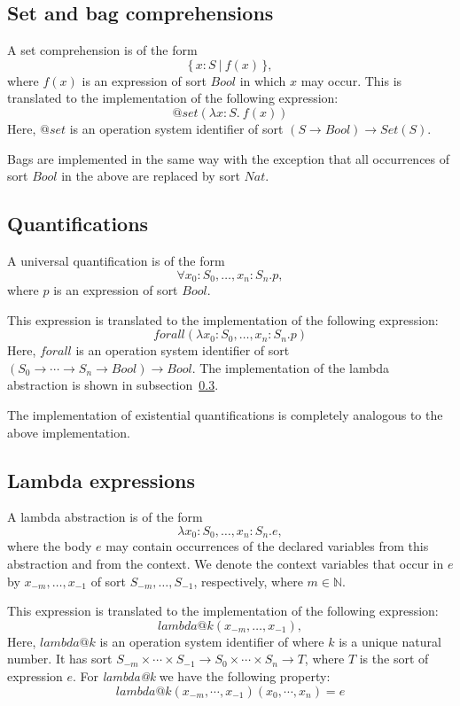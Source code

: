 \documentclass[a4paper,fleqn]{article}
\newcommand{\frm}[1]{\mbox{\ensuremath{#1}}}
\newcommand{\f}[1]{\ensuremath{\mathit{#1}}}
\newcommand{\fa}[2]{\ensuremath{\f{#1}(#2)}}
\newcommand{\set}[1]{\ensuremath{\{\,#1\,\}}}
\newcommand{\scompr}[2]{\ensuremath{\set{#1\ |\ #2}}}
\newcommand{\nat}{\ensuremath{\mathbb{N}}}
\newcommand{\srtbool}{\f{Bool}}
\newcommand{\srtnat}{\f{Nat}}
\begin{document}
\subsection{Set and bag comprehensions}

A set comprehension is of the form
\[\scompr{x{:}S}{\fa{f}{x}},\]
where \frm{\fa{f}{x}} is an expression of sort \frm{\srtbool} in which \frm{x}
may occur. This is translated to the implementation of the following
expression:
\[\fa{@set}{\lambda x{:}S.\ \fa{f}{x}}\]
Here, \frm{\f{@set}} is an operation system identifier of sort \frm{(S \to
\srtbool) \to \fa{Set}{S}}.

Bags are implemented in the same way with the exception that all occurrences of
sort \frm{\srtbool} in the above are replaced by sort \frm{\srtnat}.

\subsection{Quantifications}

A universal quantification is of the form
\[\forall x_{0}{:}S_{0}, \ldots, x_{n}{:}S_{n}. p,\]
where \frm{p} is an expression of sort \frm{\srtbool}.

This expression is translated to the implementation of the following
expression:
\[\fa{forall}{\lambda x_{0}{:}S_{0}, \ldots, x_{n}{:}S_{n}. p}\]
Here, \frm{\f{forall}} is an operation system identifier of sort 
\frm{(S_{0} \to \cdots \to S_{n} \to \srtbool) \to \srtbool}. The
implementation of the lambda abstraction is shown in
subsection~\ref{subsec:lambda}.

The implementation of existential quantifications is completely analogous to
the above implementation.

\subsection{Lambda expressions}
\label{subsec:lambda}

A lambda abstraction is of the form
\[\lambda x_{0}{:}S_{0}, \ldots, x_{n}{:}S_{n}. e,\]
where the body \frm{e} may contain occurrences of the declared variables from
this abstraction and from the context. We denote the context variables that
occur in \frm{e} by \frm{x_{-m}, \ldots, x_{-1}} of sort \frm{S_{-m}, \ldots,
S_{-1}}, respectively, where \frm{m \in \nat}.

This expression is translated to the implementation of the following
expression:
\[\fa{lambda@k}{x_{-m}, \ldots, x_{-1}},\]
Here, \frm{\f{lambda@k}} is an operation system identifier of where \frm{k} is
a unique natural number. It has sort \frm{S_{-m} \times \cdots \times S_{-1}
\to S_{0} \times \cdots \times S_{n} \to T}, where \frm{T} is the sort of expression
\frm{e}. For \emph{lambda@k} we have the following property:
\[\mathit{lambda@k}(x_{-m},\cdots,x_{-1})(x_{0},\cdots,x_{n}) = e\]
\end{document}
